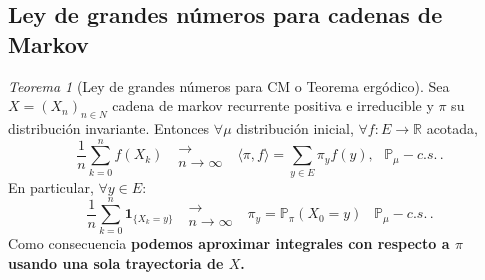 \documentclass[letterpaper,11pt]{article} %
\theoremstyle{defbreak}
\theoremstyle{propbreak}
\theoremstyle{remark}
\theoremstyle{break}
\newtheorem{theorem}{Teorema}[subsection]
\def\R{\mathbb{R}}
\def\P{\mathbb{P}}
\def\conv{\mbox{ }\substack{\longrightarrow \\ n\to\infty}\mbox{ }}
\def\xcm{(X_n)_{n\in N}}
\begin{document}
\subsection{Ley de grandes números para cadenas de Markov}
\begin{theorem}[Ley de grandes números para CM o Teorema ergódico]
\label{lgn_cm}
Sea $X=\xcm$ cadena de markov recurrente positiva e irreducible y $\pi$ su distribución invariante. Entonces $\forall\mu$ distribución inicial, $\forall f:E\to\R$ acotada,
$$ \displaystyle\frac{1}{n}\sum^n_{k=0}f(X_k)\conv\langle\pi,f\rangle=\sum_{y\in E}\pi_y f(y), \mbox{ }\P_\mu-c.s. \, .$$
En particular, $\forall y\in E$:
$$ \displaystyle\frac{1}{n}\sum^n_{k=0}\mathbf{1}_{\{X_k=y\}}\conv\pi_y=\P_\pi(X_0=y) \, \mbox{ }\P_\mu-c.s. \,  .$$
Como consecuencia \textbf{podemos aproximar integrales con respecto a $\pi$ usando una sola trayectoria de $X$.} 
\end{theorem}
\end{document}
